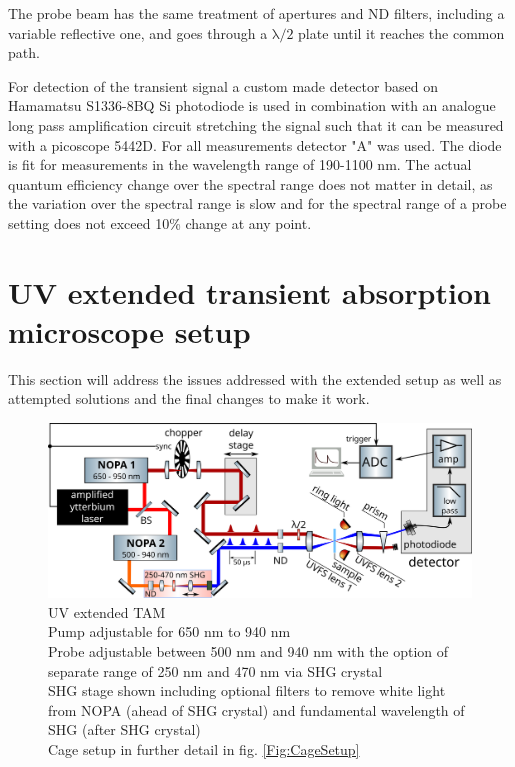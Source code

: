 \documentclass[twoside,openright]{scrreprt}
\begin{document}
The probe beam has the same treatment of apertures and ND filters, including a variable reflective one, and goes through a $\mathrm{\lambda/2}$ plate until it reaches the common path.


For detection of the transient signal a custom made detector based on Hamamatsu S1336-8BQ Si photodiode is used in combination with an analogue long pass amplification circuit stretching the signal such that it can be measured with a picoscope 5442D. For all measurements detector "A" was used. The diode is fit for measurements in the wavelength range of 190-1100 nm. The actual quantum efficiency change over the spectral range does not matter in detail, as the variation over the spectral range is slow and for the spectral range of a probe setting does not exceed 10\% change at any point.

\section{UV extended transient absorption microscope setup}
This section will address the issues addressed with the extended setup as well as attempted solutions and the final changes to make it work.

\begin{figure}[h]
\centering
\includegraphics[width=0.9\linewidth]{images/ComponentLibrary_svg/experimental_tam_shg_swapped.png}
\caption{UV extended TAM\\Pump adjustable for 650 nm to 940 nm
\\Probe adjustable between 500 nm and 940 nm with the option of separate range of 250 nm and 470 nm via SHG crystal\\
SHG stage shown including optional filters to remove white light from NOPA (ahead of SHG crystal) and fundamental wavelength of SHG (after SHG crystal)\\ Cage setup in further detail in fig. \ref{Fig:CageSetup}}
\end{figure}
\end{document}

